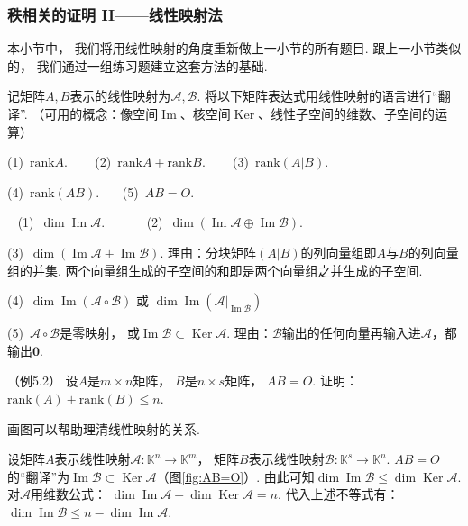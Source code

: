 \subsubsection{秩相关的证明 II——线性映射法}

本小节中，
我们将用线性映射的角度重新做上一小节的所有题目.
跟上一小节类似的，
我们通过一组练习题建立这套方法的基础.

\bigskip

\begin{example}
    记矩阵$A,B$表示的线性映射为$\mathcal{A}, \mathcal{B}$.
    将以下矩阵表达式用线性映射的语言进行“翻译”.
    （可用的概念：像空间$\operatorname{Im}$、核空间$\operatorname{Ker}$、线性子空间的维数、子空间的运算）

    (1)~$\mathrm{rank}A$. ~~~
    (2)~$\mathrm{rank}A + \mathrm{rank}B$. ~~~
    (3)~$\mathrm{rank}(A|B)$. ~~~

    (4)~$\mathrm{rank}(AB)$.~~~
    (5)~$AB=O$.
\end{example}
\smallskip
\begin{solution}
    ~
    (1)~$\dim \operatorname{Im} \mathcal{A}$.~~~~~~
    (2)~$\dim (\operatorname{Im}\mathcal{A} \oplus \operatorname{Im} \mathcal{B})$.

    (3)~$\dim (\operatorname{Im}\mathcal{A} + \operatorname{Im}\mathcal{B})$. 
    理由：分块矩阵$(A|B)$的列向量组即$A$与$B$的列向量组的并集.
    两个向量组生成的子空间的和即是两个向量组之并生成的子空间.

    (4)~$\dim \operatorname{Im}(\mathcal{A} \circ \mathcal{B}) $ 或 $\dim \operatorname{Im}(\mathcal{A}|_{\operatorname{Im}\mathcal{B}})$

    (5)~$\mathcal{A} \circ \mathcal{B}$是零映射，
    或$ \operatorname{Im} \mathcal{B} \subset \operatorname{Ker}\mathcal{A}$.
    理由：$\mathcal{B}$输出的任何向量再输入进$\mathcal{A}$，都输出$\bm{0}$.
\end{solution}
\smallskip
\begin{example}
    （例5.2）
    设$A$是$m \times n$矩阵，
    $B$是$n \times s$矩阵，
    $AB = O$.
    证明：$\mathrm{rank}(A) + \mathrm{rank}(B) \leq n$.
\end{example}
\smallskip
\begin{remark}
    画图可以帮助理清线性映射的关系.
\end{remark}
\smallskip
\begin{pf}
    设矩阵$A$表示线性映射$\mathcal{A}: \mathbb{K}^n \to \mathbb{K}^m$，
    矩阵$B$表示线性映射$\mathcal{B}: \mathbb{K}^s \to \mathbb{K}^n$.
    $AB = O$的“翻译”为$\operatorname{Im}\mathcal{B} \subset \operatorname{Ker}\mathcal{A}$（图\ref{fig:AB=O}）.
    由此可知$\dim \operatorname{Im}\mathcal{B} \leq \dim \operatorname{Ker} \mathcal{A} $.
    对$\mathcal{A}$用维数公式：
    $\dim \operatorname{Im} \mathcal{A} + \dim \operatorname{Ker} \mathcal{A} = n$.
    代入上述不等式有：
    $\dim \operatorname{Im} \mathcal{B} \leq  n - \dim \operatorname{Im} \mathcal{A}$.
\end{pf}

